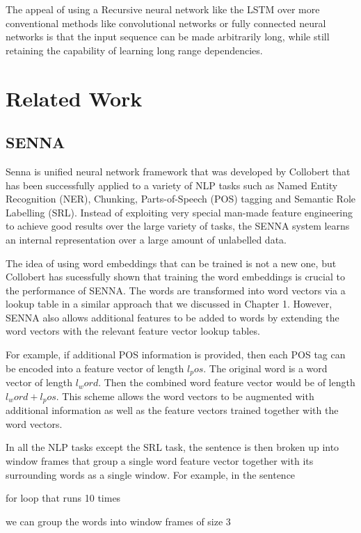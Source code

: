 \documentclass[fyp]{socreport}
\begin{document}
The appeal of using a Recursive neural network like the LSTM over more
conventional methods like convolutional networks or fully connected neural
networks is that the input sequence can be made arbitrarily long, while still
retaining the capability of learning long range dependencies.


\chapter{Related Work}
\section{SENNA}
Senna is unified neural network framework that was developed by Collobert
\cite{DBLP2011Collobert} that has been successfully applied to a variety of NLP
tasks such as Named Entity Recognition (NER), Chunking, Parts-of-Speech (POS)
tagging and Semantic Role Labelling (SRL). Instead of exploiting very special
man-made feature engineering to achieve good results over the large variety of
tasks, the SENNA system learns an internal representation over a large amount
of unlabelled data.

The idea of using word embeddings that can be trained is not a new one, but Collobert
has sucessfully shown that training the word embeddings is crucial to the
performance of SENNA. The words are transformed into word vectors via a lookup
table in a similar approach that we discussed in Chapter 1. However, SENNA also
allows additional features to be added to words by extending the word vectors
with the relevant feature vector lookup tables.

For example, if additional POS information is provided, then each POS tag can
be encoded into a feature vector of length $l_pos$. The original word is
a word vector of length $l_word$. Then the combined word feature vector would be
of length $l_word + l_pos$. This scheme allows the word vectors to be augmented
with additional information as well as the feature vectors trained together
with the word vectors.

In all the NLP tasks except the SRL task, the sentence is then broken up into
window frames that group a single word feature vector together with its surrounding
words as a single window. For example, in the sentence

\hspace{20pt}
for loop that runs 10 times

we can group the words into window frames of size 3
\end{document}
